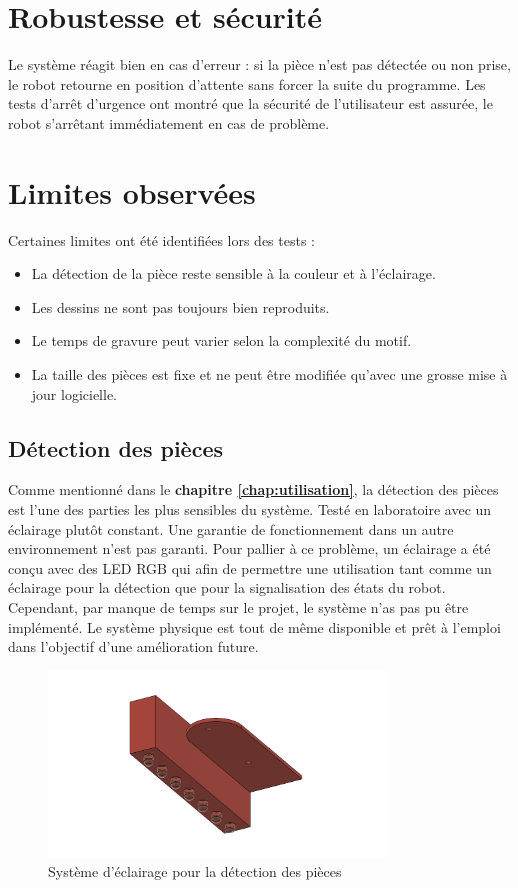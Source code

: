 \section{Robustesse et sécurité}

Le système réagit bien en cas d'erreur : si la pièce n'est pas détectée ou non prise, le robot retourne en position d'attente sans forcer la suite du programme. Les tests d'arrêt d'urgence ont montré que la sécurité de l'utilisateur est assurée, le robot s'arrêtant immédiatement en cas de problème.

\section{Limites observées}

Certaines limites ont été identifiées lors des tests :
\begin{itemize}
    \item La détection de la pièce reste sensible à la couleur et à l'éclairage.
    \item Les dessins ne sont pas toujours bien reproduits.
    \item Le temps de gravure peut varier selon la complexité du motif.
    \item La taille des pièces est fixe et ne peut être modifiée qu'avec une grosse mise à jour logicielle.
\end{itemize}

\subsection{Détection des pièces}
Comme mentionné dans le \textbf{chapitre \ref{chap:utilisation}}, la détection des pièces est l'une des parties les plus sensibles du système. Testé en laboratoire avec un éclairage plutôt constant. Une garantie de fonctionnement dans un autre environnement n'est pas garanti. Pour pallier à ce problème, un éclairage a été conçu avec des LED RGB qui afin de permettre une utilisation tant comme un éclairage pour la détection que pour la signalisation des états du robot. Cependant, par manque de temps sur le projet, le système n'as pas pu être implémenté. Le système physique est tout de même disponible et prêt à l'emploi dans l'objectif d'une amélioration future.

\begin{figure}[H]
    \centering
    \includegraphics[width=0.8\textwidth]{assets/figures/porte led v3.png}
    \caption{Système d'éclairage pour la détection des pièces}
    \label{fig:led_detection}
\end{figure}


